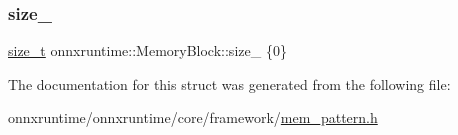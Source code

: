 \mbox{\label{structonnxruntime_1_1MemoryBlock_a6ac92a87b7de224095a042b354ac6fd1}} 
\subsubsection{\texorpdfstring{size\+\_\+}{size\_}}
{\footnotesize\ttfamily \mbox{\hyperlink{mlasi_8h_a503efbc1c6e50825320ad909366b78ab}{size\+\_\+t}} onnxruntime\+::\+Memory\+Block\+::size\+\_\+ \{0\}}



The documentation for this struct was generated from the following file\+:\begin{DoxyCompactItemize}
\item 
onnxruntime/onnxruntime/core/framework/\mbox{\hyperlink{mem__pattern_8h}{mem\+\_\+pattern.\+h}}\end{DoxyCompactItemize}

